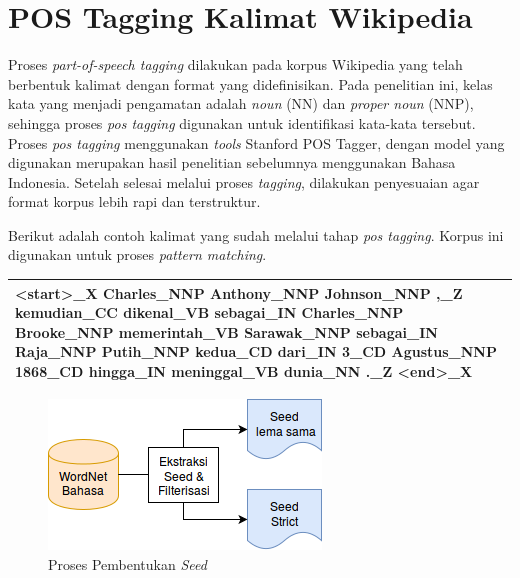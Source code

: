 \section{POS Tagging Kalimat Wikipedia}
Proses \textit{part-of-speech tagging} dilakukan pada korpus Wikipedia yang telah berbentuk kalimat dengan format yang didefinisikan. Pada penelitian ini, kelas kata yang menjadi pengamatan adalah \textit{noun} (NN) dan \textit{proper noun} (NNP), sehingga proses \textit{pos tagging} digunakan untuk identifikasi kata-kata tersebut. Proses \textit{pos tagging} menggunakan \textit{tools} Stanford POS Tagger, dengan model yang digunakan merupakan hasil penelitian sebelumnya menggunakan Bahasa Indonesia.  Setelah selesai melalui proses \textit{tagging}, dilakukan penyesuaian agar format korpus lebih rapi dan terstruktur. 

Berikut adalah contoh kalimat yang sudah melalui tahap \textit{pos tagging}. Korpus ini digunakan untuk proses \textit{pattern matching}.
\begin{center}
\begin{tabular}{ | m{32em} | } 
\hline
<start>\_X Charles\_NNP Anthony\_NNP Johnson\_NNP ,\_Z kemudian\_CC dikenal\_VB sebagai\_IN Charles\_NNP Brooke\_NNP memerintah\_VB Sarawak\_NNP sebagai\_IN Raja\_NNP Putih\_NNP kedua\_CD dari\_IN 3\_CD Agustus\_NNP 1868\_CD hingga\_IN meninggal\_VB dunia\_NN .\_Z <end>\_X \\ 
\hline
\end{tabular}
\end{center}


\begin{figure}
    \centering
    \includegraphics[width=\linewidth]{pics/Pic02-SeedBuilder}
    \caption{Proses Pembentukan \textit{Seed}}
    \label{fig:seed-builder}
\end{figure}
